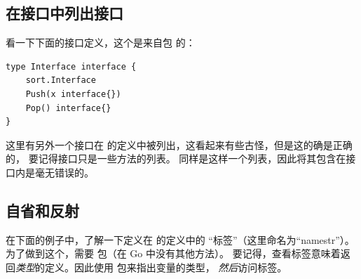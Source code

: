 \subsection{在接口中列出接口}
看一下下面的接口定义，这个是来自包  的：
\begin{lstlisting}
type Interface interface {
    sort.Interface
    Push(x interface{})
    Pop() interface{}
}
\end{lstlisting}
这里有另外一个接口在  的定义中被列出，这看起来有些古怪，但是这的确是正确的，%
要记得接口只是一些方法的列表。 同样是这样一个列表，因此将其包含在接口内是毫无错误的。

\subsection{自省和反射}
\label{sec:introspection and reflection}
在下面的例子中，了解一下定义在  的定义中的 ``标签''（这里命名为``namestr''）。
为了做到这个，需要  包（在 Go 中没有其他方法）。
要记得，查看标签意味着返回\emph{类型}的定义。因此使用  包来指出变量的类型，
\emph{然后}访问标签。

\showremarks

